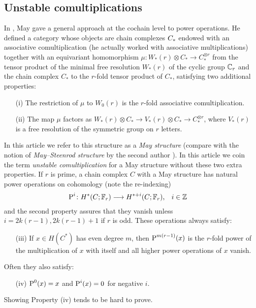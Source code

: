 \subsection{Unstable comultiplications} In \cite{may1970general}, May gave a general approach at the cochain level to power operations. He defined a category whose objects are chain complexes $C_{*}$ endowed with an associative comultiplication (he actually worked with associative multiplications) together with an equivariant homomorphism $\mu\colon W_*(r)\otimes C_*\to C_*^{\otimes r}$ from the tensor product of the minimal free resolution $W_*(r)$ of the cyclic group $\mathbb{C}_r$ and the chain complex $C_*$ to the $r$-fold tensor product of $C_*$, satisfying two additional properties:
\begin{itemize}
	\item[(i)] The restriction of $\mu$ to $W_0(r)$ is the $r$-fold associative comultiplication.
	\item[(ii)] The map $\mu$ factors as $W_*(r)\otimes C_* \to V_*(r)\otimes C_*\to C_*^{\otimes r}$, where $V_*(r)$ is a free resolution of the symmetric group on $r$ letters.
\end{itemize}
In this article we refer to this structure as a \emph{May structure} (compare with the notion of \emph{May--Steenrod structure} by the second author \cite{medina2021may_st}). In this article we coin the term \emph{unstable comultiplication} for a May structure without these two extra properties. If $r$ is prime, a chain complex $C$ with a May structure has natural power operations on cohomology (note the re-indexing)
\begin{align*}
	\operatorname{P}^i\colon H^*(C;\mathbb{F}_r)&\longrightarrow H^{*+i}(C;\mathbb{F}_r), & i\in \mathbb{Z}
\end{align*}
and the second property assures that they vanish unless $i = 2k(r-1), 2k(r-1)+1$ if $r$ is odd.
These operations always satisfy:
\begin{itemize}
	\item[(iii)] If $x\in H(C^*)$  has even degree $m$, then $\operatorname{P}^{m(r-1)}(x)$ is the $r$-fold power of the multiplication of $x$ with itself and all higher power operations of $x$ vanish.
\end{itemize}
Often they also satisfy:
\begin{enumerate}
	\item[(iv)] $\operatorname{P}^0(x) = x$ and $\operatorname{P}^i(x) = 0$ for negative $i$.
\end{enumerate}
Showing Property (iv) tends to be hard to prove.

